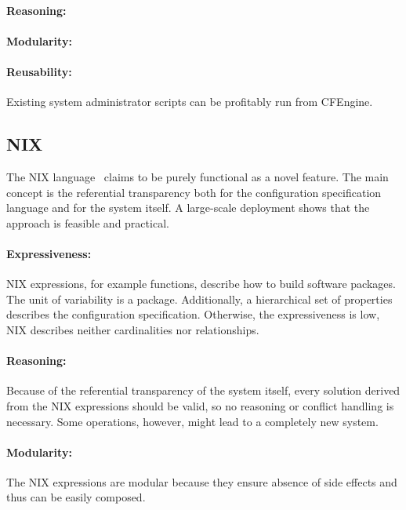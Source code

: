 \paragraph*{Reasoning:}
\notsupported{}
\paragraph*{Modularity:}
\notsupported{}

\paragraph*{Reusability:}
Existing system administrator scripts can be profitably run from CFEngine.


\subsection{NIX}

The NIX language~\cite{dolstra2007purely} claims to be purely functional as a novel feature.
The main concept is the referential transparency both for the configuration specification language and for the system itself.
A large-scale deployment shows that the approach is feasible and practical.

\paragraph*{Expressiveness:}
NIX expressions, for example functions, describe how to build software packages.
The unit of variability is a package.
Additionally, a hierarchical set of properties describes the configuration specification.
Otherwise, the expressiveness is low, NIX describes neither cardinalities nor relationships.

\paragraph*{Reasoning:}
Because of the referential transparency of the system itself, every solution derived from the NIX expressions should be valid, so no reasoning or conflict handling is necessary.
Some operations, however, might lead to a completely new system.

\paragraph*{Modularity:}
The NIX expressions are modular because they ensure absence of side effects and thus can be easily composed.

